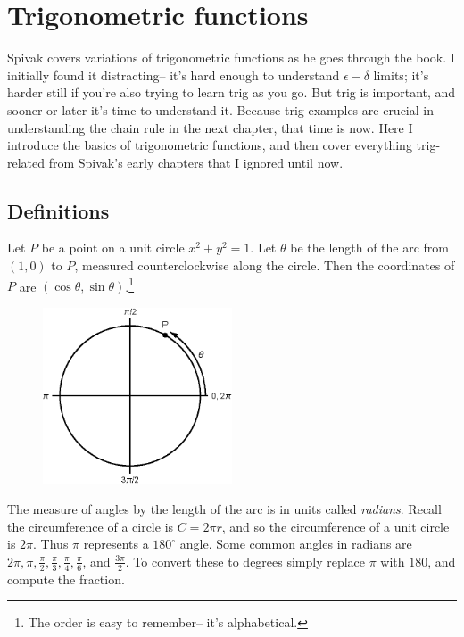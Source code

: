 \section{Trigonometric functions}

Spivak covers variations of trigonometric functions as he goes through
the book. I initially found it distracting-- it's hard enough to
understand $\epsilon-\delta$ limits; it's harder still if you're also trying to
learn trig as you go. But trig is important, and sooner or later it's
time to understand it. Because trig examples are crucial in
understanding the chain rule in the next chapter, that time is now.
Here I introduce the basics of trigonometric functions, and then cover
everything trig-related from Spivak's early chapters that I ignored
until now.

\subsection{Definitions}

Let $P$ be a point on a unit circle $x^2+y^2=1$. Let $\theta$ be the length
of the arc from $(1,0)$ to $P$, measured counterclockwise along the
circle. Then the coordinates of $P$ are
$(\cos\theta,\sin\theta)$.\footnote{The order is easy to remember-- it's
  alphabetical.}

\begin{figure}[htbp]
  \centering
  \includegraphics[width=0.5\textwidth]{eps/prereqs/trigtldr.eps}
\end{figure}

The measure of angles by the length of the arc is in units called
\textit{radians}. Recall the circumference of a circle is $C=2\pi r$,
and so the circumference of a unit circle is $2\pi$. Thus $\pi$ represents
a $180^\circ$ angle. Some common angles in radians are
$2\pi, \pi,\frac{\pi}{2}, \frac{\pi}{3}, \frac{\pi}{4}, \frac{\pi}{6}$, and
$\frac{3\pi}{2}$. To convert these to degrees simply replace $\pi$ with
$180$, and compute the fraction.


